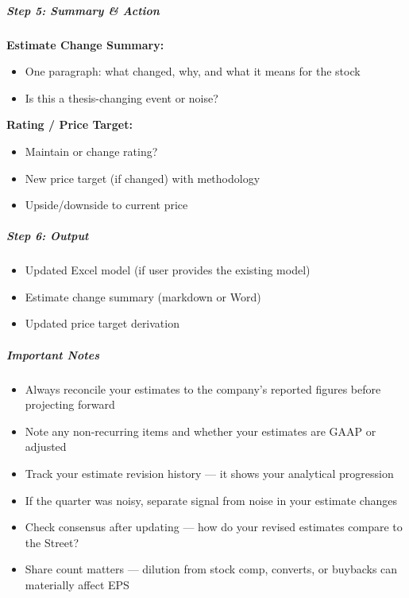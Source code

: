 \documentclass[11pt]{article}
\begin{document}
\subparagraph{Step 5: Summary \& Action}\mbox{}\par

\textbf{Estimate Change Summary:}

\begin{itemize}[leftmargin=*,itemsep=2pt,topsep=2pt]
\item {} One paragraph: what changed, why, and what it means for the stock
\item {} Is this a thesis-changing event or noise?
\end{itemize}

\textbf{Rating / Price Target:}

\begin{itemize}[leftmargin=*,itemsep=2pt,topsep=2pt]
\item {} Maintain or change rating?
\item {} New price target (if changed) with methodology
\item {} Upside/downside to current price
\end{itemize}

\subparagraph{Step 6: Output}\mbox{}\par

\begin{itemize}[leftmargin=*,itemsep=2pt,topsep=2pt]
\item {} Updated Excel model (if user provides the existing model)
\item {} Estimate change summary (markdown or Word)
\item {} Updated price target derivation
\end{itemize}

\subparagraph{Important Notes}\mbox{}\par

\begin{itemize}[leftmargin=*,itemsep=2pt,topsep=2pt]
\item {} Always reconcile your estimates to the company's reported figures before projecting forward
\item {} Note any non-recurring items and whether your estimates are GAAP or adjusted
\item {} Track your estimate revision history — it shows your analytical progression
\item {} If the quarter was noisy, separate signal from noise in your estimate changes
\item {} Check consensus after updating — how do your revised estimates compare to the Street?
\item {} Share count matters — dilution from stock comp, converts, or buybacks can materially affect EPS
\end{itemize}
\end{document}
